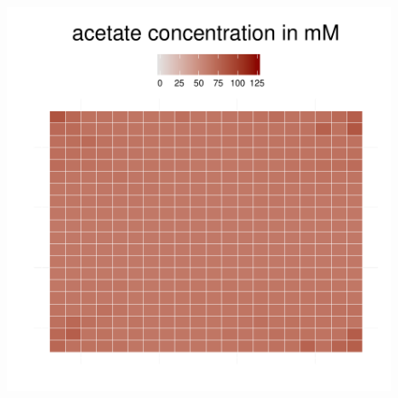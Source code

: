 \begin{figure}[h!]
{\begin{minipage}[t]{0.3\textwidth}
  \end{minipage}
  \begin{minipage}[t]{0.3\textwidth}
    \includegraphics[width=\textwidth]{../results/img/ecoli_20x20_aerob_seed55_ace50.pdf}
  \end{minipage}
  }
\end{figure}
